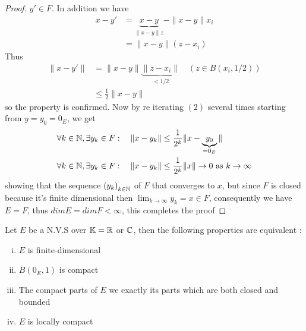 \begin{proof}
$y' \in F $. In addition we have 
\begin{align*}
	x-y' &=  
\underbrace{x-y}_{ \| x-y \|z }  - \| x-y \| x_{i} \\
             &= \| x-y \|  (z-x_{i}) 
\end{align*}
Thus 
\begin{align*}
	\| x-y' \|  &= 
	\| x-y \|
	\underbrace{
	\| z-x_{i} \| 
	}_{ <  1/2}                         \quad  (z \in  B(x_{i}, 1/2) )  
	\\
		    & \leq 
		    \frac{1}{2} \| x-y \|  
\end{align*}
so the property is confirmed. Now by re iterating $(2)$ several times starting 
from $y = y_0 = 0_{E} $, we get 
\begin{align*}
&\forall  k \in  \mathbb{N}, \exists y_{k} \in F : \quad 
\| x-y_{k} \|  \leq  \frac{1}{2^{k}} \| x -
\underbrace{y_0 
}_{ = 0_{E}} \|  \\
&\forall k \in \mathbb{N}, \exists y_{k} \in  F : 
\quad \| x-y_{k} \|  \leq \frac{1}{2^{k}} \| x \|  \rightarrow 0 \text{ as } k \rightarrow \infty 
\end{align*}
showing that the sequence $\left( y_{k} \right)_{k \in \mathbb{N}} $ of $F $ that converges 
to $x $, but since $F $ is closed because it's finite dimensional then $\lim_{k \to \infty } 
y_{k} = x \in F$, consequently we have $E = F $, thus $dim E = dim F <  \infty  $, this 
completes the proof
\end{proof}
\begin{corollary}[F.Riesz]
	Let $E $ be a N.V.S over $\mathbb{K} = \mathbb{R}  $ or $\mathbb{C}  $, then the following properties 
	are equivalent : 
	\begin{enumerate}[(i)]
	\item  $E$ is finite-dimensional
	\item $\overline{B}(0_{E},1)  $  is compact 
	\item The compact parts of $E $ we exactly its parts which 
		are both closed and bounded 
	\item $E $ is locally compact 
	\end{enumerate}
\end{corollary}
